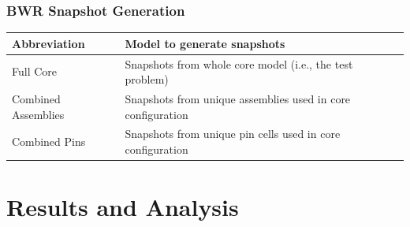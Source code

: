 \documentclass[fleqn]{beamer}
\begin{document}
  \begin{frame}
    \frametitle{BWR Snapshot Generation}
    \begin{table}
      \begin{tabular}{l | p{6cm}}\toprule
	Abbreviation         & Model to generate snapshots \\
	\hline
	Full Core            & Snapshots from whole core model (i.e., the test problem) \\
	Combined Assemblies  & Snapshots from unique assemblies used in core configuration \\
	Combined Pins        & Snapshots from unique pin cells used in core configuration \\
	\bottomrule
      \end{tabular}
      \label{tab:bwrsnapshots}
    \end{table}
  \end{frame}

  \section{Results and Analysis}

\end{document}
